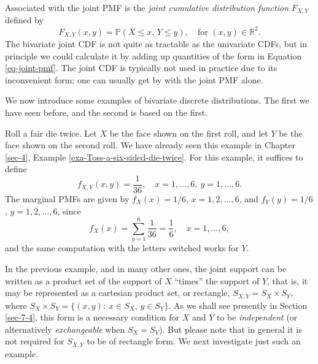 \documentclass[captions=tableheading]{scrbook}
\begin{document}
Associated with the joint PMF is the \emph{joint cumulative distribution function} \(F_{X,Y}\) defined by
\[
F_{X,Y}(x,y)=\mathbb{P}(X\leq x,\, Y\leq y),\quad \mbox{for }(x,y)\in\mathbb{R}^{2}.
\]
The bivariate joint CDF is not quite as tractable as the univariate CDFs, but in principle we could calculate it by adding up quantities of the form in Equation \ref{eq-joint-pmf}. The joint CDF is typically not used in practice due to its inconvenient form; one can usually get by with the joint PMF alone.

We now introduce some examples of bivariate discrete distributions. The first we have seen before, and the second is based on the first.

\begin{example}

Roll a fair die twice. Let \(X\) be the face shown on the first roll, and let \(Y\) be the face shown on the second roll. We have already seen this example in Chapter \ref{sec-4}, Example \ref{exa-Toss-a-six-sided-die-twice}. For this example, it suffices to define
\[
f_{X,Y}(x,y)=\frac{1}{36},\quad x=1,\ldots,6,\ y=1,\ldots,6.
\]
The marginal PMFs are given by \(f_{X}(x)=1/6\), \(x=1,2,\ldots,6\), and \(f_{Y}(y)=1/6\), \(y=1,2,\ldots,6\), since
\[
f_{X}(x)=\sum_{y=1}^{6}\frac{1}{36}=\frac{1}{6},\quad x=1,\ldots,6,
\]
and the same computation with the letters switched works for \(Y\). 
\end{example}

In the previous example, and in many other ones, the joint support can be written as a product set of the support of \(X\) ``times'' the support of \(Y\), that is, it may be represented as a cartesian product set, or rectangle, \(S_{X,Y}=S_{X}\times S_{Y}\), where \(S_{X} \times S_{Y}= \{ (x,y):\ x\in S_{X},\, y\in S_{Y} \} \). As we shall see presently in Section \ref{sec-7-4}, this form is a necessary condition for \(X\) and \(Y\) to be \emph{independent} (or alternatively \emph{exchangeable} when \(S_{X}=S_{Y}\)). But please note that in general it is not required for \(S_{X,Y}\) to be of rectangle form. We next investigate just such an example.
\end{document}
